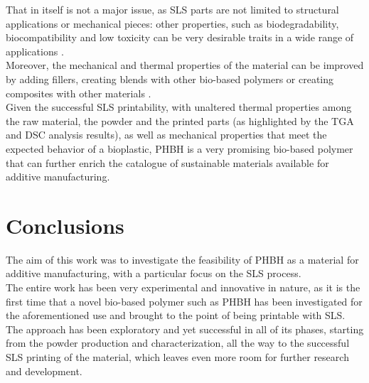 \documentclass[a4paper]{article}
\begin{document}
        That in itself is not a major issue, as SLS parts are not limited to structural applications or mechanical pieces:
        other properties, such as biodegradability, biocompatibility and low toxicity can be very desirable traits in a wide range of 
        applications \autocites{SLS_3dprinting_biomedical_polymers, Kovalcik_PHA_Review}. \\ 

        Moreover, the mechanical and thermal properties of the material can be improved by adding fillers, creating blends with other 
        bio-based polymers or creating composites with other materials \autocites{Recent_progress_polymers_AM,Eraslan_PHBH_review,PHBH_Crystallinity,Polymers_composite_overview,Advances_3D_printing_polymer_composites,Novel_PHBH_biocomposite_nanocrystals}. \\ 

        Given the successful SLS printability, with unaltered thermal properties among the raw material, the powder and the 
        printed parts (as highlighted by the TGA and DSC analysis results), as well as 
        mechanical properties that meet the expected behavior of a bioplastic, PHBH is a very promising bio-based polymer 
        that can further enrich the catalogue of sustainable materials available for additive manufacturing. \\ 

        \clearpage

    
    \section{Conclusions\label{conclusions}}

    The aim of this work was to investigate the feasibility of PHBH as a 
    material for additive manufacturing, with a particular focus on the SLS process. \\ 

    The entire work has been very experimental and innovative in nature, as it is the first time that a novel bio-based polymer such as PHBH has been investigated 
    for the aforementioned use and brought to the point of being printable with SLS. \\
    
    The approach has been exploratory and yet successful in all of its phases, starting from the powder production and characterization, all the way to the successful 
    SLS printing of the material, which leaves even more room for further research and development. \\ 
\end{document}
